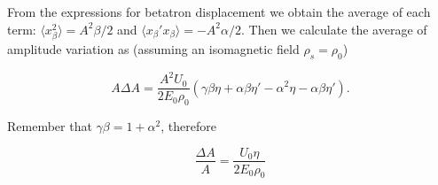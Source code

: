 From the expressions for betatron displacement we obtain the average of each term: $\langle x_\beta ^2 \rangle = A^2 \beta /2$ and $\langle x_\beta' x_\beta  \rangle =  - A^2 \alpha /2$.
Then we calculate the average of amplitude variation as (assuming an isomagnetic field $\rho_s = \rho_0$)

\[
A\Delta A = \dfrac{ A^2 U_0}{2 E_0 \rho_0} \left(\gamma \beta \eta + \alpha \beta \eta' - \alpha^2\eta  - \alpha \beta  \eta'\right).
\]

Remember that $\gamma\beta = 1 + \alpha^2$, therefore

\begin{equation}
\dfrac{\Delta A}{A} = \dfrac{U_0 \eta }{2 E_0 \rho_0}
\end{equation}
